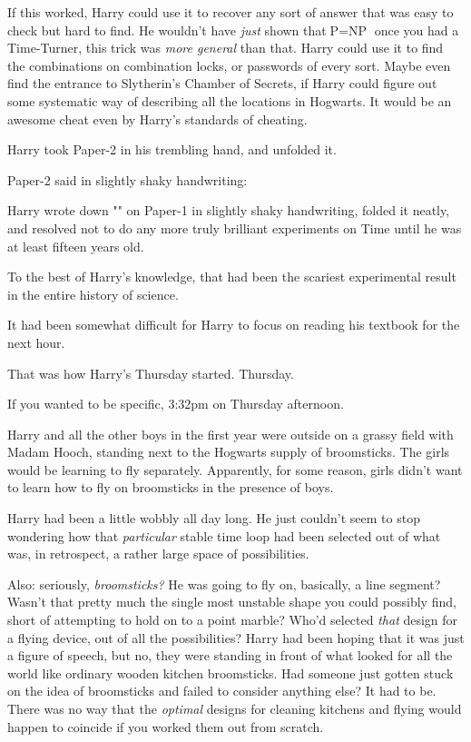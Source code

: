 If this worked, Harry could use it to recover any sort of answer that was easy
to check but hard to find. He wouldn't have \emph{just} shown that$\mbox{P}=\mbox{NP}$ once
you had a Time-Turner, this trick was \emph{more general} than that. Harry
could use it to find the combinations on combination locks, or passwords of
every sort. Maybe even find the entrance to Slytherin's Chamber of Secrets, if
Harry could figure out some systematic way of describing all the locations in
Hogwarts. It would be an awesome cheat even by Harry's standards of cheating.

Harry took Paper-2 in his trembling hand, and unfolded it.

Paper-2 said in slightly shaky handwriting:


Harry wrote down "" on Paper-1 in slightly shaky
handwriting, folded it neatly, and resolved not to do any more truly brilliant
experiments on Time until he was at least fifteen years old.

To the best of Harry's knowledge, that had been the scariest experimental
result in the entire history of science.

It had been somewhat difficult for Harry to focus on reading his textbook for
the next hour.

That was how Harry's Thursday started.
\sbreak
Thursday.

If you wanted to be specific, 3:32pm on Thursday afternoon.

Harry and all the other boys in the first year were outside on a grassy field
with Madam Hooch, standing next to the Hogwarts supply of broomsticks. The
girls would be learning to fly separately. Apparently, for some reason, girls
didn't want to learn how to fly on broomsticks in the presence of boys.

Harry had been a little wobbly all day long. He just couldn't seem to stop
wondering how that \emph{particular} stable time loop had been selected out of
what was, in retrospect, a rather large space of possibilities.

Also: seriously, \emph{broomsticks?} He was going to fly on, basically, a line
segment? Wasn't that pretty much the single most unstable shape you could
possibly find, short of attempting to hold on to a point marble? Who'd selected
\emph{that} design for a flying device, out of all the possibilities? Harry had
been hoping that it was just a figure of speech, but no, they were standing in
front of what looked for all the world like ordinary wooden kitchen
broomsticks. Had someone just gotten stuck on the idea of broomsticks and
failed to consider anything else? It had to be. There was no way that the
\emph{optimal} designs for cleaning kitchens and flying would happen to
coincide if you worked them out from scratch.

